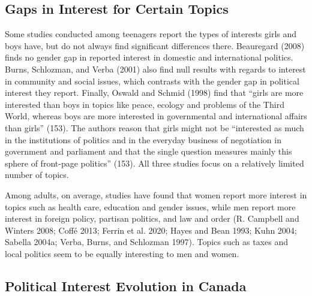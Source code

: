 \documentclass[
  letterpaper,
  DIV=11,
  numbers=noendperiod]{scrreprt}
\begin{document}
\subsection{Gaps in Interest for Certain
Topics}\label{gaps-in-interest-for-certain-topics}

Some studies conducted among teenagers report the types of interests
girls and boys have, but do not always find significant differences
there. Beauregard (2008) finds no gender gap in reported interest in
domestic and international politics. Burns, Schlozman, and Verba (2001)
also find null results with regards to interest in community and social
issues, which contrasts with the gender gap in political interest they
report. Finally, Oswald and Schmid (1998) find that ``girls are more
interested than boys in topics like peace, ecology and problems of the
Third World, whereas boys are more interested in governmental and
international affairs than girls'' (153). The authors reason that girls
might not be ``interested as much in the institutions of politics and in
the everyday business of negotiation in government and parliament and
that the single question measures mainly this sphere of front-page
politics'' (153). All three studies focus on a relatively limited number
of topics.

Among adults, on average, studies have found that women report more
interest in topics such as health care, education and gender issues,
while men report more interest in foreign policy, partisan politics, and
law and order (R. Campbell and Winters 2008; Coffé 2013; Ferrin et al.
2020; Hayes and Bean 1993; Kuhn 2004; Sabella 2004a; Verba, Burns, and
Schlozman 1997). Topics such as taxes and local politics seem to be
equally interesting to men and women.

\subsection{Political Interest Evolution in
Canada}\label{political-interest-evolution-in-canada}
\end{document}
